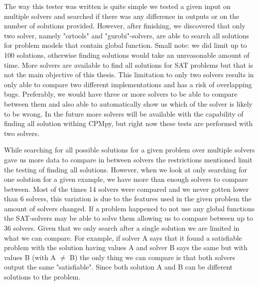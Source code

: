 The way this tester was written is quite simple we tested a given input on multiple solvers and searched if there was any difference in outputs or on the number of solutions provided.
However, after finishing, we discovered that only two solver, namely "ortools" and "gurobi"-solvers, are able to search all solutions for problem models that contain global function. Small note: we did limit up to 100 solutions, otherwise finding solutions would take an unreasonable amount of time. More solvers are available to find all solutions for SAT problems but that is not the main objective of this thesis. This limitation to only two solvers results in only able to compare two different implementations and has a risk of overlapping bugs. Preferably, we would have three or more solvers to be able to compare between them and also able to automatically show us which of the solver is likely to be wrong. In the future more solvers will be available with the capability of finding all solution withing CPMpy, but right now these tests are performed with two solvers. 

While searching for all possible solutions for a given problem over multiple solvers gave us more data to compare in between solvers the restrictions mentioned limit the testing of finding all solutions. However, when we look at only searching for one solution for a given example, we have more than enough solvers to compare between. Most of the times 14 solvers were compared and we never gotten lower than 6 solvers, this variation is due to the features used in the given problem the amount of solvers changed. If a problem happened to not use any global functions the SAT-solvers may be able to solve them allowing us to compare between up to 36 solvers. Given that we only search after a single solution we are limited in what we can compare. For example, if solver A says that it found a satisfiable problem with the solution having values A and solver B says the same but with values B (with A $\neq$ B) the only thing we can compare is that both solvers output the same "satisfiable". Since both solution A and B can be different solutions to the problem.


